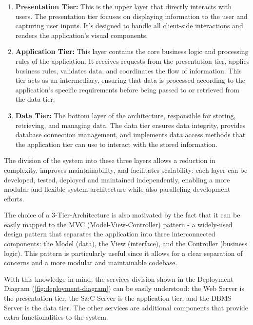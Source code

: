 \begin{enumerate}
      \item \textbf{Presentation Tier:} This is the upper layer that directly interacts with users. The presentation tier
            focuses on displaying information to the user and capturing user inputs. It's designed to handle all client-side
            interactions and renders the application's visual components.
      \item \textbf{Application Tier:} This layer contains the core business logic and processing rules of the
            application. It receives requests from the presentation tier, applies business rules, validates data, and
            coordinates the flow of information. This tier acts as an intermediary, ensuring that data is processed
            according to the application's specific requirements before being passed to or retrieved from the data tier.
      \item \textbf{Data Tier:} The bottom layer of the architecture, responsible for storing, retrieving, and managing
            data. The data tier ensures data integrity, provides database connection management, and implements data
            access methods that the application tier can use to interact with the stored information.
\end{enumerate}

The division of the system into these three layers allows a reduction in complexity, improves maintainability, and
facilitates scalability: each layer can be developed, tested, deployed and maintained independently, enabling a more
modular and flexible system architecture while also paralleling development efforts.

The choice of a 3-Tier-Architecture is also motivated by the fact that it can be easily mapped to the MVC
(Model-View-Controller) pattern - a widely-used design pattern that separates the application into three interconnected
components: the Model (data), the View (interface), and the Controller (business logic). This pattern is particularly
useful since it allows for a clear separation of concerns and a more modular and maintainable codebase.

With this knowledge in mind, the services division shown in the Deployment Diagram (\ref{fig:deployment-diagram}) can
be easily understood: the Web Server is the presentation tier, the S\&C Server is the application tier, and the DBMS
Server is the data tier. The other services are additional components that provide extra functionalities to the system.

